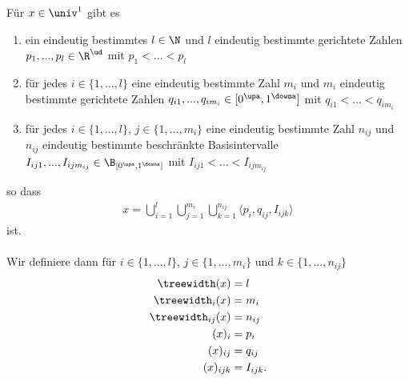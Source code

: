 \begin{satzdef}
    Für $x \in \univ^1$ gibt es
    \begin{enumerate}
        \item ein eindeutig bestimmtes $l \in \N$ und $l$ eindeutig bestimmte gerichtete Zahlen $p_1, ..., p_l \in \R^\ud$ mit $p_1 < ... < p_l$
        \item für jedes $i \in \{1, ..., l\}$ eine eindeutig bestimmte Zahl $m_i$ und $m_i$ eindeutig bestimmte gerichtete Zahlen $q_{i1}, ..., q_{im_i} \in [0^\upa, 1^\downa]$ mit $q_{i1} < ... < q_{im_i}$
        \item für jedes $i \in \{1, ..., l\}$, $j \in \{1, ..., m_i\}$ eine eindeutig bestimmte Zahl $n_{ij}$ und $n_{ij}$ eindeutig bestimmte beschränkte Basisintervalle $I_{ij1}, ..., I_{ijm_{ij}} \in \B_{[0^\upa, 1^\downa]}$ mit $I_{ij1} < ... < I_{ijm_{ij}}$
    \end{enumerate}
    so dass
    \begin{align*}
        x = \bigcup_{i=1}^l \bigcup_{j=1}^{m_i} \bigcup_{k=1}^{n_{ij}} \langle p_i, q_{ij}, I_{ijk} \rangle
    \end{align*}
    ist.\\ \ \\
    Wir definiere dann für $i \in \{1, ..., l\}$, $j \in \{1, ..., m_i\}$ und $k \in \{1, ..., n_{ij}\}$
    \begin{align*}
        \treewidth(x) &= l\\
        \treewidth_i(x) &= m_i\\
        \treewidth_{ij}(x) &= n_{ij}\\
        (x)_i &= p_i\\
        (x)_{ij} &= q_{ij}\\
        (x)_{ijk} &= I_{ijk}.
    \end{align*}
\end{satzdef}


